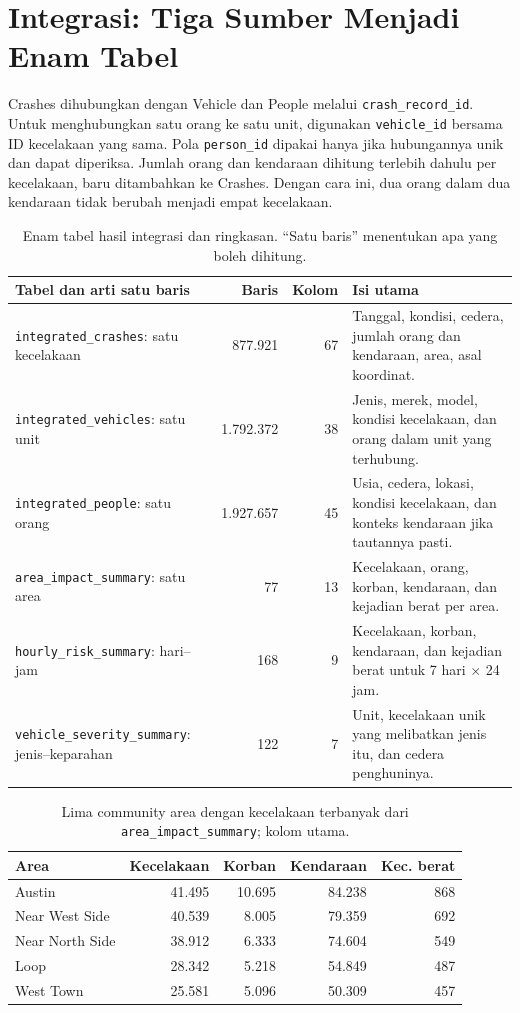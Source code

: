\documentclass[10pt,a4paper]{article}
\begin{document}
\section{Integrasi: Tiga Sumber Menjadi Enam Tabel}

Crashes dihubungkan dengan Vehicle dan People melalui
\texttt{crash\_record\_id}. Untuk menghubungkan satu orang ke satu unit,
digunakan \texttt{vehicle\_id} bersama ID kecelakaan yang sama. Pola
\texttt{person\_id} dipakai hanya jika hubungannya unik dan dapat diperiksa.
Jumlah orang dan kendaraan dihitung terlebih dahulu per kecelakaan, baru
ditambahkan ke Crashes. Dengan cara ini, dua orang dalam dua kendaraan
tidak berubah menjadi empat kecelakaan.

\begin{table}[H]
\centering\footnotesize
\caption{Enam tabel hasil integrasi dan ringkasan. ``Satu baris'' menentukan apa yang boleh dihitung.}
\begin{tabularx}{\linewidth}{p{4.5cm}rr>{\raggedright\arraybackslash}X}
\toprule
Tabel dan arti satu baris & Baris & Kolom & Isi utama\\
\midrule
\texttt{integrated\_crashes}: satu kecelakaan & 877.921 & 67 & Tanggal, kondisi, cedera, jumlah orang dan kendaraan, area, asal koordinat.\\
\texttt{integrated\_vehicles}: satu unit & 1.792.372 & 38 & Jenis, merek, model, kondisi kecelakaan, dan orang dalam unit yang terhubung.\\
\texttt{integrated\_people}: satu orang & 1.927.657 & 45 & Usia, cedera, lokasi, kondisi kecelakaan, dan konteks kendaraan jika tautannya pasti.\\
\texttt{area\_impact\_summary}: satu area & 77 & 13 & Kecelakaan, orang, korban, kendaraan, dan kejadian berat per area.\\
\texttt{hourly\_risk\_summary}: hari--jam & 168 & 9 & Kecelakaan, korban, kendaraan, dan kejadian berat untuk 7 hari $\times$ 24 jam.\\
\texttt{vehicle\_severity\_summary}: jenis--keparahan & 122 & 7 & Unit, kecelakaan unik yang melibatkan jenis itu, dan cedera penghuninya.\\
\bottomrule
\end{tabularx}
\end{table}

\begin{table}[H]
\centering\scriptsize
\caption{Lima community area dengan kecelakaan terbanyak dari \texttt{area\_impact\_summary}; kolom utama.}
\begin{tabular}{lrrrr}
\toprule
Area & Kecelakaan & Korban & Kendaraan & Kec. berat\\
\midrule
Austin & 41.495 & 10.695 & 84.238 & 868\\
Near West Side & 40.539 & 8.005 & 79.359 & 692\\
Near North Side & 38.912 & 6.333 & 74.604 & 549\\
Loop & 28.342 & 5.218 & 54.849 & 487\\
West Town & 25.581 & 5.096 & 50.309 & 457\\
\bottomrule
\end{tabular}
\end{table}
\end{document}
